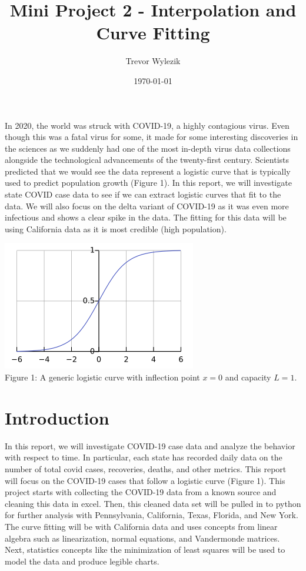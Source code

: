 \documentclass[12pt]{article}
\title{Mini Project 2 - Interpolation and Curve Fitting}
\author{Trevor Wylezik}
\date{\today}
\begin{document}
\maketitle

\abstract
{\noindent
In 2020, the world was struck with COVID-19, a highly contagious virus. Even though this was a fatal virus for some, it made for some interesting discoveries in the sciences as we suddenly had one of the most in-depth virus data collections alongside the technological advancements of the twenty-first century. Scientists predicted that we would see the data represent a logistic curve that is typically used to predict population growth (Figure 1). In this report, we will investigate state COVID case data to see if we can extract logistic curves that fit to the data. We will also focus on the delta variant of COVID-19 as it was even more infectious and shows a clear spike in the data. The fitting for this data will be using California data as it is most credible (high population). 
}

\begin{center}
\includegraphics[width = .6\textwidth]{Logistic Curve.png}\\
Figure 1: A generic logistic curve with inflection point $x=0$ and capacity $L=1$. 
\end{center}
\pagebreak


\section{Introduction}
In this report, we will investigate COVID-19 case data and analyze the behavior with respect to time. In particular, each state has recorded daily data on the number of total covid cases, recoveries, deaths, and other metrics. This report will focus on the COVID-19 cases that follow a logistic curve (Figure 1). This project starts with collecting the COVID-19 data from a known source and cleaning this data in excel. Then, this cleaned data set will be pulled in to python for further analysis with Pennsylvania, California, Texas, Florida, and New York. The curve fitting will be with California data and uses concepts from linear algebra such as linearization, normal equations, and Vandermonde matrices. Next, statistics concepts like the minimization of least squares will be used to model the data and produce legible charts. \\
\end{document}
